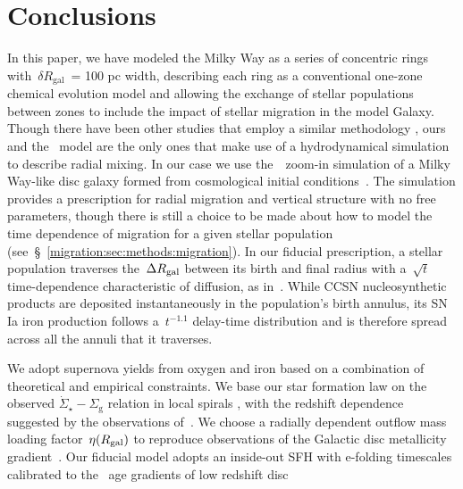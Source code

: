 
\section{Conclusions} 
\label{migration:sec:conclusions} 

In this paper, we have modeled the Milky Way as a series of concentric rings 
with~$\delta R_\text{gal}$~= 100 pc width, describing each ring as a 
conventional one-zone chemical evolution model and allowing the exchange of 
stellar populations between zones to include the impact of stellar migration in 
the model Galaxy. 
Though there have been other studies that employ a similar methodology 
\citep[e.g.][]{Schoenrich2009a, Schoenrich2009b, Kubryk2015a, Kubryk2015b, 
Sharma2021}, ours and the~\citet{Minchev2013, Minchev2014, Minchev2017} model 
are the only ones that make use of a hydrodynamical simulation to describe 
radial mixing. 
In our case we use the~\hsim~zoom-in simulation of a Milky Way-like disc galaxy 
formed from cosmological initial conditions~\citep{Christensen2012, 
Zolotov2012, Loebman2012, Brooks2014, Bird2021}. 
The simulation provides a prescription for radial migration and vertical 
structure with no free parameters, though there is still a choice to be made 
about how to model the time dependence of migration for a given stellar 
population (see~\S~\ref{migration:sec:methods:migration}). 
In our fiducial prescription, a stellar population traverses the~$\Delta R_\text{gal}$ 
between its birth and final radius with a~$\sqrt{t}$ time-dependence 
characteristic of diffusion, as in~\citet{Frankel2018, Frankel2020}. 
While CCSN nucleosynthetic products are deposited instantaneously in the 
population's birth annulus, its SN Ia iron production follows a~$t^{-1.1}$ 
delay-time distribution and is therefore spread across all the annuli that it 
traverses. 
\par 
We adopt supernova yields from oxygen and iron based on a combination of 
theoretical and empirical constraints. 
We base our star formation law on the observed 
$\dot{\Sigma}_\star - \Sigma_\text{g}$ relation in local spirals 
\citep{Bigiel2010, Leroy2013, Krumholz2018a}, with the redshift dependence 
suggested by the observations of~\citet{Tacconi2018}. 
We choose a radially dependent outflow mass loading factor~$\eta(R_\text{gal})$ to 
reproduce observations of the Galactic disc metallicity 
gradient~\citep[e.g.][]{Frinchaboy2013, Hayden2014, Weinberg2019}. 
Our fiducial model adopts an inside-out SFH with e-folding timescales 
calibrated to the~\citet{Sanchez2020} age gradients of low redshift disc 
